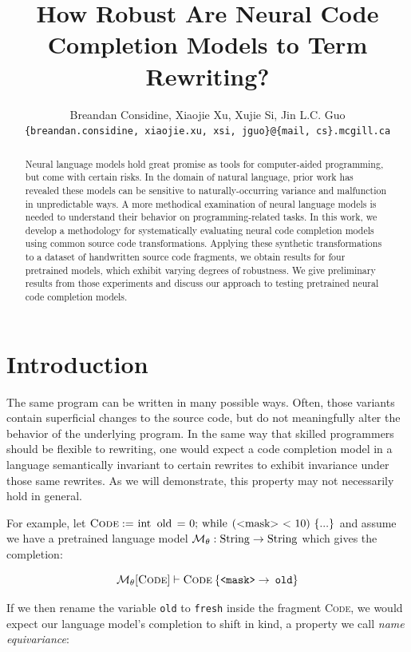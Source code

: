 \documentclass[usenames,dvipsnames]{article} %
\title{How Robust Are Neural Code Completion Models to Term Rewriting?}
\author{Breandan Considine, Xiaojie Xu, Xujie Si, Jin L.C. Guo\\
\texttt{\{breandan.considine, xiaojie.xu, xsi, jguo\}@\{mail, cs\}.mcgill.ca}\\
}
\begin{document}
  \maketitle

  \begin{abstract}
    Neural language models hold great promise as tools for computer-aided programming, but come with certain risks. In the domain of natural language, prior work has revealed these models can be sensitive to naturally-occurring variance and malfunction in unpredictable ways. A more methodical examination of neural language models is needed to understand their behavior on programming-related tasks. In this work, we develop a methodology for systematically evaluating neural code completion models using common source code transformations. Applying these synthetic transformations to a dataset of handwritten source code fragments, we obtain results for four pretrained models, which exhibit varying degrees of robustness. We give preliminary results from those experiments and discuss our approach to testing pretrained neural code completion models.
  \end{abstract}

  \section{Introduction}\label{sec:introduction}

  The same program can be written in many possible ways. Often, those variants contain superficial changes to the source code, but do not meaningfully alter the behavior of the underlying program. In the same way that skilled programmers should be flexible to rewriting, one would expect a code completion model in a language semantically invariant to certain rewrites to exhibit invariance under those same rewrites. As we will demonstrate, this property may not necessarily hold in general.

  For example, let $\textsc{Code} := \lstinline|int old = 0; while (<mask> < 10) {...}|$ and assume we have a pretrained language model $\mathcal{M}_\theta: \lstinline|String|\rightarrow\lstinline|String|$ which gives the completion:

  \begin{equation}
    \mathcal{M}_\theta[\textsc{Code}] \vdash \textsc{Code}\:\{\texttt{<mask>} \rightarrow \:\texttt{old}\}
  \end{equation}

  If we then rename the variable \texttt{old} to \texttt{fresh} inside the fragment \textsc{Code}, we would expect our language model's completion to shift in kind, a property we call \textit{name equivariance}:
\end{document}
